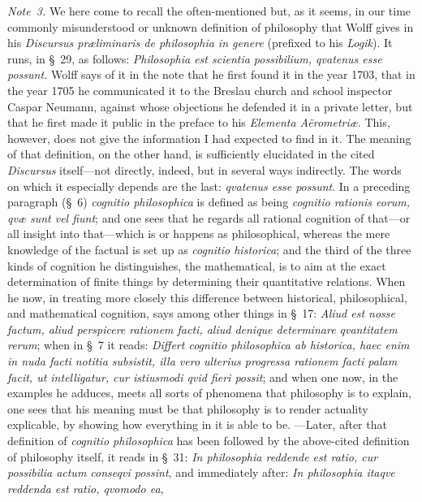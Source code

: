 \documentclass[12pt,a4paper]{book}
\begin{document}
{\small\emph{Note~3.} We here come to recall the often-mentioned but, as it seems,
in our time commonly misunderstood or unknown definition of philosophy that Wolff
gives in his \textit{Discursus præliminaris de philosophia in genere} (prefixed to
his \textit{Logik}). It runs, in \S~29, as follows: \textit{Philosophia est scientia
possibilium, qvatenus esse possunt.} Wolff says of it in the note that he first
found it in the year 1703, that in the year 1705 he communicated it to the Breslau
church and school inspector Caspar Neumann, against whose objections he defended it
in a private letter, but that he first made it public in the preface to his
\textit{Elementa Aërometriæ}. This, however, does not give the information I had
expected to find in it. The meaning of that definition, on the other hand, is
sufficiently elucidated in the cited \textit{Discursus} itself---not directly,
indeed, but in several ways indirectly. The words on which it especially depends are
the last: \textit{qvatenus esse possunt}. In a preceding paragraph (\S~6)
\textit{cognitio philosophica} is defined as being \textit{cognitio rationis eorum,
qvæ sunt vel fiunt}; and one sees that he regards all rational cognition of
that---or all insight into that---which is or happens as philosophical, whereas the
mere knowledge of the factual is set up as \textit{cognitio historica}; and the
third of the three kinds of cognition he distinguishes, the mathematical, is to aim
at the exact determination of finite things by determining their quantitative
relations. When he now, in treating more closely this difference between historical,
philosophical, and mathematical cognition, says among other things in \S~17:
\textit{Aliud est nosse factum, aliud perspicere rationem facti, aliud denique
determinare qvantitatem rerum}; when in \S~7 it reads: \textit{Differt cognitio
philosophica ab historica, haec enim in nuda facti notitia subsistit, illa vero
ulterius progressa rationem facti palam facit, ut intelligatur, cur istiusmodi qvid
fieri possit}; and when one now, in the examples he adduces, meets all sorts of
phenomena that philosophy is to explain, one sees that his meaning must be that
philosophy is to render actuality explicable, by showing how everything in it is
able to be. ---Later, after that definition of \textit{cognitio philosophica} has
been followed by the above-cited definition of philosophy itself, it reads in \S~31:
\textit{In philosophia reddende est ratio, cur possibilia actum conseqvi possint},
and immediately after: \textit{In philosophia itaqve reddenda est ratio, qvomodo ea,
}}
\end{document}
